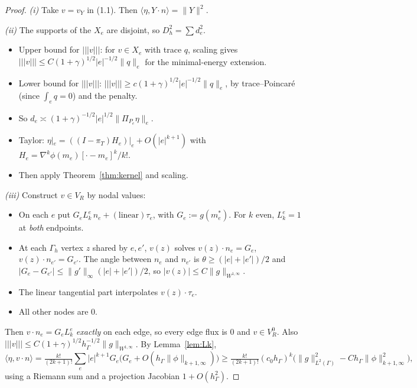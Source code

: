 \documentclass[11pt]{article}
\theoremstyle{remark}
\newcommand{\tn}[1]{|\!|\!|#1|\!|\!|}
\newcommand{\hG}{h_\Gamma}
\newcommand{\Gh}{\Gamma_h}
\newcommand{\ip}[2]{\langle #1,#2\rangle}
\begin{document}
\begin{proof}
\emph{(i)} Take $v=v_Y$ in (1.1). Then $\ip{\eta}{Y\cdot n}=\|Y\|^2$.

\emph{(ii)} The supports of the $X_e$ are disjoint, so $D_h^2=\sum d_e^2$.
\begin{itemize}
\item Upper bound for $\tn v$: for $v\in X_e$ with trace $q$, scaling gives $\tn v\le C(1+\gamma)^{1/2}|e|^{-1/2}\|q\|_e$ for
the minimal-energy extension.
\item Lower bound for $\tn v$: $\tn v\ge c(1+\gamma)^{1/2}|e|^{-1/2}\|q\|_e$, by trace--Poincar\'e (since $\int_e q=0$) and
the penalty.
\item So $d_e\asymp(1+\gamma)^{-1/2}|e|^{1/2}\|\Pi_{P_e}\eta\|_e$.
\item Taylor: $\eta|_e=((I-\pi_T)H_e)|_e+O(|e|^{k+1})$ with $H_e=\nabla^k\phi(m_e)[\cdot-m_e]^k/k!$.
\item Then apply Theorem~\ref{thm:kernel} and scaling.
\end{itemize}

\emph{(iii)} Construct $v\in V_R$ by nodal values:
\begin{itemize}
\item On each $e$ put $G_e L_k^e\,n_e+(\text{linear})\tau_e$, with $G_e:=g(m_e^\ast)$. For $k$ even, $L_k^e=1$ at \emph{both}
endpoints.
\item At each $\Gh$ vertex $z$ shared by $e,e'$, $v(z)$ solves $v(z)\cdot n_e=G_e$, $v(z)\cdot n_{e'}=G_{e'}$. The angle between
$n_e$ and $n_{e'}$ is $\theta\ge(|e|+|e'|)/2$ and $|G_e-G_{e'}|\le\|g'\|_\infty(|e|+|e'|)/2$, so
$|v(z)|\le C\|g\|_{W^{1,\infty}}$.
\item The linear tangential part interpolates $v(z)\cdot\tau_e$.
\item All other nodes are $0$.
\end{itemize}
Then $v\cdot n_e=G_eL_k^e$ \emph{exactly} on each edge, so every edge flux is $0$ and $v\in V_R^0$. Also
$\tn v\le C(1+\gamma)^{1/2}\hG^{-1/2}\|g\|_{W^{1,\infty}}$. By Lemma~\ref{lem:Lk},
\[
\ip{\eta}{v\cdot n}=\tfrac{k!}{(2k+1)!}\sum_e|e|^{k+1}G_e\big(G_e+O(\hG\|\phi\|_{k+1,\infty})\big)
\ge\tfrac{k!}{(2k+1)!}(c_0\hG)^k\big(\|g\|_{L^2(\Gamma)}^2-C\hG\|\phi\|^2_{k+1,\infty}\big),
\]
using a Riemann sum and a projection Jacobian $1+O(\hG^2)$.
\end{proof}
\end{document}
